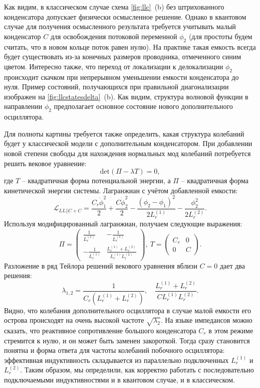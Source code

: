 \documentclass[14pt, a4paper]{extreport}
\numberwithin{equation}{section}
\begin{document}
Как видим, в классическом случае схема \autoref{fig:llc}~(b) без штрихованного конденсатора допускает физически осмысленное решение. Однако в квантовом случае для получения осмысленного результата требуется учитывать малый конденсатор $C$ для освобождения потоковой переменной $\phi_2$ (для простоты будем считать, что в новом кольце поток равен нулю). На практике такая емкость всегда будет существовать из-за конечных размеров проводника, отмеченного синим цветом. Интересно также, что переход от локализации к делокализации $\phi_2$ происходит скачком при непрерывном уменьшении емкости конденсатора до нуля. Пример состояний, получающихся при правильной диагонализации изображен на \autoref{fig:llcstatesdelta}~(b). Как видим, структура волновой функции в направлении $\phi_2$ предполагает основное состояние нового дополнительного осциллятора. 

Для полноты картины требуется также определить, какая структура колебаний будет у классической модели с дополнительным конденсатором. При добавлении новой степени свободы для нахождения нормальных мод колебаний потребуется решить вековое уравнение:
\begin{equation}
	\text{det}(\Pi - \lambda T) = 0,
\end{equation}
где $T$ -- квадратичная форма потенциальной энергии, а $\Pi$ -- квадратичная форма кинетической энергии системы. Лагранжиан с учётом добавленной емкости:
\begin{equation}
\mathcal{L}_{LL||C+C} = \frac{C_r \dot\phi_1^2}{2} + \frac{C \dot\phi_2^2}{2} - \frac{(\phi_2 - \phi_1)^2}{2L_r^{(1)}} - \frac{\phi_2^2}{2 L_r^{(2)}}.
\end{equation}
Используя модифицированный лагранжиан, получаем следующие выражения:
\begin{equation}
	\Pi = \left(
	\begin{matrix}
	\frac{1}{L_r^{(1)}}&-\frac{1}{L_r^{(1)}}\\
	-\frac{1}{L_r^{(1)}}&\frac{L_r^{(1)}+L_r^{(2)}}{L_r^{(1)}L_r^{(2)}}
	\end{matrix}\right),\ 
	T = \left(
	\begin{matrix}
	C_r& 0 \\
	0 & C
	\end{matrix}\right).
\end{equation}
Разложение в ряд Тейлора решений векового уравнения вблизи $C = 0$ дает два решения:
\begin{equation}
	\lambda_{1,2} = \frac{1}{C_r\left(L_r^{(1)}+L_r^{(2)}\right)},\quad \frac{L_r^{(1)}+L_r^{(2)}}{C L_r^{(1)}L_r^{(2)}}.
\end{equation}
Видно, что колебания дополнительного осциллятора в случае малой емкости его острова происходят на очень высокой частоте $\sqrt{\lambda_2}$. На языке импедансов можно сказать, что реактивное сопротивление большого конденсатора $C_r$ в этом режиме стремится к нулю, и он может быть заменен закороткой. Тогда сразу становится понятна и форма ответа для частоты колебаний побочного осциллятора: эффективная индуктивность складывается из параллельно подключенных $L_r^{(1)}$ и $L_r^{(2)}$. Таким образом, мы определили, как корректно работать с последовательно подключаемыми индуктивностями и в квантовом случае, и в классическом.
\end{document}
